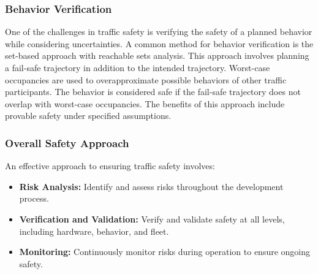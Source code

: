 \subsubsection*{Behavior Verification}
One of the challenges in traffic safety is verifying the safety of a planned behavior while considering uncertainties. A common method for behavior verification is the set-based approach with reachable sets analysis. This approach involves planning a fail-safe trajectory in addition to the intended trajectory. Worst-case occupancies are used to overapproximate possible behaviors of other traffic participants. The behavior is considered safe if the fail-safe trajectory does not overlap with worst-case occupancies. The benefits of this approach include provable safety under specified assumptions.

\subsubsection*{Overall Safety Approach}
An effective approach to ensuring traffic safety involves:
\begin{itemize}
    \item \textbf{Risk Analysis:} Identify and assess risks throughout the development process.
    \item \textbf{Verification and Validation:} Verify and validate safety at all levels, including hardware, behavior, and fleet.
    \item \textbf{Monitoring:} Continuously monitor risks during operation to ensure ongoing safety.
\end{itemize}
